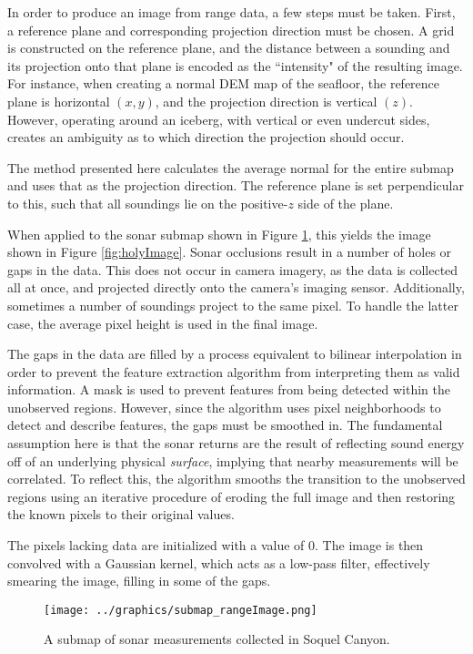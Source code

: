 In order to produce an image from range data, a few steps must be taken. First, a reference plane and corresponding projection direction must be chosen. A grid is constructed on the reference plane, and the distance between a sounding and its projection onto that plane is encoded as the ``intensity" of the resulting image. For instance, when creating a normal DEM map of the seafloor, the reference plane is horizontal $(x,y)$, and the projection direction is vertical $(z)$. However, operating around an iceberg, with vertical or even undercut sides, creates an ambiguity as to which direction the projection should occur. 

The method presented here calculates the average normal for the entire submap and uses that as the projection direction. The reference plane is set perpendicular to this, such that all soundings lie on the positive-$z$ side of the plane.

When applied to the sonar submap shown in Figure \ref{fig:submap_rangeImage}, this yields the image shown in Figure \ref{fig:holyImage}. Sonar occlusions result in a number of holes or gaps in the data. This does not occur in camera imagery, as the data is collected  all at once, and projected directly onto the camera's imaging sensor. Additionally, sometimes a number of soundings project to the same pixel. To handle the latter case, the average pixel height is used in the final image. 

The gaps in the data are filled by a process equivalent to bilinear interpolation in order to prevent the feature extraction algorithm from interpreting them as valid information. A mask is used to prevent features from being detected within the unobserved regions. However, since the algorithm uses pixel neighborhoods to detect and describe features, the gaps must be smoothed in. The fundamental assumption here is that the sonar returns are the result of reflecting sound energy off of an underlying physical \emph{surface}, implying that nearby measurements will be correlated.  To reflect this, the algorithm smooths the transition to the unobserved regions using an iterative procedure of eroding the full image and then restoring the known pixels to their original values.

The pixels lacking data are initialized with a value of $0$. The image is then convolved with a Gaussian kernel, which acts as a low-pass filter, effectively smearing the image, filling in some of the gaps. 

\begin{figure}[htb]
   \centering
   \texttt{[image: ../graphics/submap\_rangeImage.png]} %
   \caption{A submap of sonar measurements collected in Soquel Canyon.}
   \label{fig:submap_rangeImage}
\end{figure}


